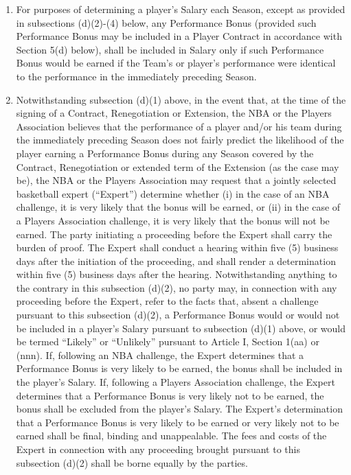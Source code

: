 \documentclass[
]{book}
\providecommand{\tightlist}{%
  \setlength{\itemsep}{0pt}\setlength{\parskip}{0pt}}
\begin{document}
\begin{enumerate}
  \begin{enumerate}
  \def\labelenumii{(\arabic{enumii})}
  \tightlist
  \item
    For purposes of determining a player's Salary each Season, except as provided in subsections (d)(2)-(4) below, any Performance Bonus (provided such Performance Bonus may be included in a Player Contract in accordance with Section 5(d) below), shall be included in Salary only if such Performance Bonus would be earned if the Team's or player's performance were identical to the performance in the immediately preceding Season.
  \item
    Notwithstanding subsection (d)(1) above, in the event that, at the time of the signing of a Contract, Renegotiation or Extension, the NBA or the Players Association believes that the performance of a player and/or his team during the immediately preceding Season does not fairly predict the likelihood of the player earning a Performance Bonus during any Season covered by the Contract, Renegotiation or extended term of the Extension (as the case may be), the NBA or the Players Association may request that a jointly selected basketball expert (``Expert'') determine whether (i) in the case of an NBA challenge, it is very likely that the bonus will be earned, or (ii) in the case of a Players Association challenge, it is very likely that the bonus will not be earned. The party initiating a proceeding before the Expert shall carry the burden of proof. The Expert shall conduct a hearing within five (5) business days after the initiation of the proceeding, and shall render a determination within five (5) business days after the hearing. Notwithstanding anything to the contrary in this subsection (d)(2), no party may, in connection with any proceeding before the Expert, refer to the facts that, absent a challenge pursuant to this subsection (d)(2), a Performance Bonus would or would not be included in a player's Salary pursuant to subsection (d)(1) above, or would be termed ``Likely'' or ``Unlikely'' pursuant to Article I, Section 1(aa) or (nnn). If, following an NBA challenge, the Expert determines that a Performance Bonus is very likely to be earned, the bonus shall be included in the player's Salary. If, following a Players Association challenge, the Expert determines that a Performance Bonus is very likely not to be earned, the bonus shall be excluded from the player's Salary. The Expert's determination that a Performance Bonus is very likely to be earned or very likely not to be earned shall be final, binding and unappealable. The fees and costs of the Expert in connection with any proceeding brought pursuant to this subsection (d)(2) shall be borne equally by the parties.

\end{enumerate}
\end{enumerate}
\end{document}
